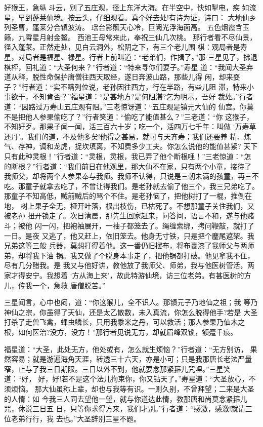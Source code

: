 好猴王，急纵斗云，别了五庄观，径上东洋大海。在半空中，快如掣电，疾
如流星，早到蓬莱仙境。按云头，仔细观看。真个好去处!有诗为证，诗曰：
大地仙乡列圣曹，蓬莱分合镇波涛。
瑶台影蘸天心冷，巨阙光浮海面高。
五色烟霞含玉籁，九霄星月射金鳌。
西池王母常来此，奉祝三仙几次桃。
那行者看不尽仙景，径入蓬莱。正然走处，见白云洞外，松阴之下，有三个老儿围
棋：观局者是寿星，对局者是福星、禄星。行者上前叫道：“老弟们，作揖了。”那
三星见了，拂退棋枰，回礼道：“大圣何来？”行者道：“特来寻你们耍子。”寿星
道：“我闻大圣弃道从释，脱性命保护唐僧往西天取经，遂日奔波山路，那些儿得
闲，却来耍子？”行者道：“实不瞒列位说，老孙因往西方，行在半路，有些儿阻
滞，特来小事欲干，不知肯否？”福星道：“是甚地方?是何阻滞?乞为明示，吾好
裁处。”行者道：“因路过万寿山五庄观有阻。”三老惊讶道：“五庄观是镇元大仙的
仙宫。你莫不是把他人参果偷吃了？”行者笑道：“偷吃了能值甚么？”三老道：“你
这猴子，不知好歹。那果子闻一闻，活三百六十岁；吃一个，活四万七千年：叫做
‘万寿草还丹’。我们的道，不及他多矣!他得之甚易，就可与天齐寿；我们还要养
精、炼气、存神，调和龙虎，捉坎填离，不知费多少工夫。你怎么说他的能值甚紧?
天下只有此种灵根！”行者道：“灵根，灵根，我已弄了他个断根哩！”三老惊道：“怎
的断根？”行者道：“我们前日在他观里，那大仙不在家，只有两个小童，接待了
我师父，却将两个人参果奉与我师。我师不认得，只说是三朝未满的孩童，再三不
吃。那童子就拿去吃了，不曾让得我们。是老孙就去偷了他三个，我三兄弟吃了。
那童子不知高低，贼前贼后的骂个不住。是老孙恼了，把他树打了一棍，推倒在地，
树上果子全无，桠开叶落，根出枝伤，已枯死了。不想那童子关住我们，又被老孙
扭开锁走了。次日清晨，那先生回家赶来，问答间，语言不和，遂与他赌斗；被他
闪一闪，把袍袖展开，一袖子都笼去了。绳缠索绑，拷问鞭敲，就打了一日。是夜
又逃了，他又赶上，依旧笼去。他身无寸铁，只是把个麈尾遮架。我兄弟这等三般
兵器，莫想打得着他。这一番仍旧摆布，将布裹漆了我师父与两师弟，却将我下油
锅。我又做了个脱身本事走了，把他锅都打破。他见拿我不住，尽有几分醋我。是
我又与他好讲，教他放了我师父、师弟，我与他医树管活，两家才得安宁。我想着
‘方从海上来’，故此特游仙境，访三位老弟。有甚医树的方儿，传我一个，急救
唐僧脱苦。”

三星闻言，心中也闷，道：“你这猴儿，全不识人。那镇元子乃地仙之祖；我
等乃神仙之宗，你虽得了天仙，还是太乙散数，未入真流，你怎么脱得他手?若是
大圣打杀了走兽飞禽，蜾虫鳞长，只用我黍米之丹，可以救活；那人参果乃仙木之
根，如何医治?没方，没方！”那行者见说无方，却就眉峰双锁，额蹙千痕。

福星道：“大圣，此处无方，他处或有，怎么就生烦恼？”行者道：“无方别访，
果然容易；就是游遍海角天涯，转透三十六天，亦是小可；只是我那唐长老法严量
窄，止与了我三日期限。三日以外不到，他就要念那紧箍儿咒哩。”三星笑道：“好，
好，好!若不是这个法儿拘束你，你又钻天了。”寿星道：“大圣放心，不须烦恼。
那大仙虽称上辈，却也与我等有识。一则久别，不曾拜望；二来是大圣的人情：如
今我三人同去望他一望，就与你道达此情，教那唐和尚莫念紧箍儿咒，休说三日五
日，只等你求得方来，我们才别。”行者道：“感激，感激!就请三位老弟行行，我
去也。”大圣辞别三星不题。

